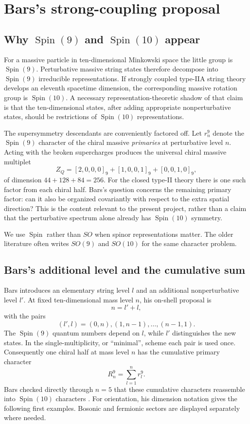 \documentclass[11pt,a4paper]{article}
\theoremstyle{definition}
\newcommand{\Spin}{\operatorname{Spin}}
\begin{document}
\tableofcontents
\newpage

\section{Bars's strong-coupling proposal}

\subsection{Why $\Spin(9)$ and $\Spin(10)$ appear}

For a massive particle in ten-dimensional Minkowski space the little group
is $\Spin(9)$.  Perturbative massive string states therefore decompose into
$\Spin(9)$ irreducible representations.  If strongly coupled type-IIA string
theory develops an eleventh spacetime dimension, the corresponding massive
rotation group is $\Spin(10)$.  A necessary representation-theoretic shadow
of that claim is that the ten-dimensional states, after adding appropriate
nonperturbative states, should be restrictions of $\Spin(10)$
representations.

The supersymmetry descendants are conveniently factored off.  Let $r_n^9$
denote the $\Spin(9)$ character of the chiral massive \emph{primaries} at
perturbative level $n$.  Acting with the broken supercharges produces the
universal chiral massive multiplet
\[
 Z_Q=[2,0,0,0]_9+[1,0,0,1]_9+[0,0,1,0]_9,
\]
of dimension $44+128+84=256$.  For the closed type-II theory there is one
such factor from each chiral half.  Bars's question concerns the remaining
primary factor: can it also be organized covariantly with respect to the
extra spatial direction?  This is the content relevant to the present
project, rather than a claim that the perturbative spectrum alone already
has $\Spin(10)$ symmetry.

We use $\Spin$ rather than $SO$ when spinor representations matter.  The
older literature often writes $SO(9)$ and $SO(10)$ for the same character
problem.

\subsection{Bars's additional level and the cumulative sum}

Bars introduces an elementary string level $l$ and an additional
nonperturbative level $l'$.  At fixed ten-dimensional mass level $n$, his
on-shell proposal is
\[
   n=l'+l,
\]
with the pairs
\[
   (l',l)=(0,n),(1,n-1),\ldots,(n-1,1).
\]
The $\Spin(9)$ quantum numbers depend on $l$, while $l'$ distinguishes the
new states.  In the single-multiplicity, or ``minimal'', scheme each pair is
used once.  Consequently one chiral half at mass level $n$ has the cumulative
primary character
\begin{equation}
\label{eq:bars-cumulative}
   R_n^9=\sum_{l=1}^{n}r_l^9.
\end{equation}
Bars checked directly through $n=5$ that these cumulative characters
reassemble into $\Spin(10)$ characters \cite{Bars}.  For orientation, his
dimension notation gives the following first examples.  Bosonic and
fermionic sectors are displayed separately where needed.
\end{document}
